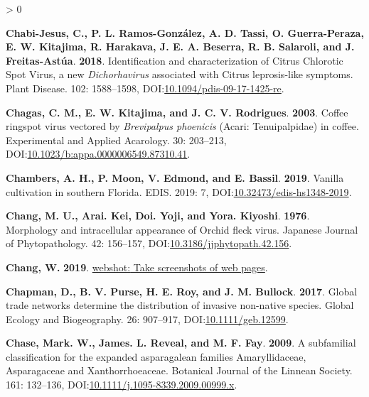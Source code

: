 \documentclass{ufdissertation}[overrideChapters] %
\newlength{\cslhangindent}
\newenvironment{CSLReferences}[2] %
 {%
  \setlength{\parindent}{0pt}
  \ifodd #1 \everypar{\setlength{\hangindent}{\cslhangindent}}\ignorespaces\fi
  \ifnum #2 > 0
  \setlength{\parskip}{#2\baselineskip}
  \fi
 }%
 {}
\begin{document}
{\begin{CSLReferences}{1}{1}
\leavevmode{}%
\textbf{Chabi-Jesus, C., P. L. Ramos-González, A. D. Tassi, O. Guerra-Peraza, E. W. Kitajima, R. Harakava, J. E. A. Beserra, R. B. Salaroli, and J. Freitas-Astúa}. \textbf{2018}. Identification and characterization of {Citrus Chlorotic Spot Virus}, a new {\emph{Dichorhavirus}} associated with {Citrus leprosis}-like symptoms. Plant Disease. 102: 1588--1598, DOI:\href{https://doi.org/10.1094/pdis-09-17-1425-re}{10.1094/pdis-09-17-1425-re}.

\leavevmode{}%
\textbf{Chagas, C. M., E. W. Kitajima, and J. C. V. Rodrigues}. \textbf{2003}. {Coffee ringspot virus} vectored by {\emph{Brevipalpus phoenicis}} ({Acari}: {Tenuipalpidae}) in coffee. Experimental and Applied Acarology. 30: 203--213, DOI:\href{https://doi.org/10.1023/b:appa.0000006549.87310.41}{10.1023/b:appa.0000006549.87310.41}.

\leavevmode{}%
\textbf{Chambers, A. H., P. Moon, V. Edmond, and E. Bassil}. \textbf{2019}. Vanilla cultivation in southern {Florida}. {EDIS}. 2019: 7, DOI:\href{https://doi.org/10.32473/edis-hs1348-2019}{10.32473/edis-hs1348-2019}.

\leavevmode{}%
\textbf{Chang, M. U., Arai. Kei, Doi. Yoji, and Yora. Kiyoshi}. \textbf{1976}. Morphology and intracellular appearance of {Orchid fleck virus}. Japanese Journal of Phytopathology. 42: 156--157, DOI:\href{https://doi.org/10.3186/jjphytopath.42.156}{10.3186/jjphytopath.42.156}.

\leavevmode{}%
\textbf{Chang, W.} \textbf{2019}. \href{https://CRAN.R-project.org/package=webshot}{{webshot:} Take screenshots of web pages}.

\leavevmode{}%
\textbf{Chapman, D., B. V. Purse, H. E. Roy, and J. M. Bullock}. \textbf{2017}. Global trade networks determine the distribution of invasive non-native species. Global Ecology and Biogeography. 26: 907--917, DOI:\href{https://doi.org/10.1111/geb.12599}{10.1111/geb.12599}.

\leavevmode{}%
\textbf{Chase, Mark. W., James. L. Reveal, and M. F. Fay}. \textbf{2009}. A subfamilial classification for the expanded asparagalean families {Amaryllidaceae}, {Asparagaceae} and {Xanthorrhoeaceae}. Botanical Journal of the Linnean Society. 161: 132--136, DOI:\href{https://doi.org/10.1111/j.1095-8339.2009.00999.x}{10.1111/j.1095-8339.2009.00999.x}.


\end{CSLReferences}}
\end{document}
